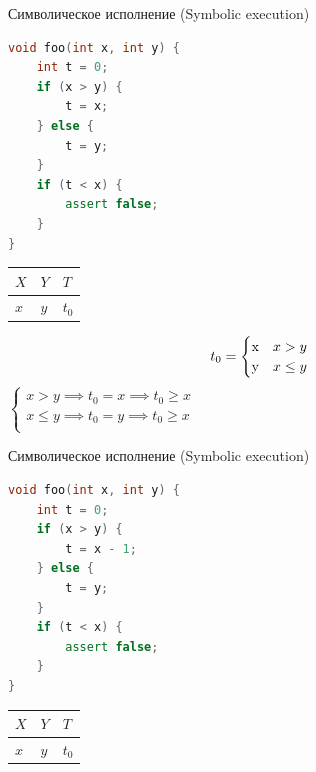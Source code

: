 \documentclass{beamer}
\begin{document}
\begin{frame}[fragile]{Символическое исполнение (Symbolic execution)}
\begin{minipage}{0.49\textwidth}
\begin{lstlisting}[language=C++]
void foo(int x, int y) {
    int t = 0;
    if (x > y) {
        t = x;
    } else {
        t = y;
    }
    if (t < x) {
        assert false;
    }
}
\end{lstlisting}
\end{minipage}
\hfill
\begin{minipage}{0.49\textwidth}
\begin{center}
\begin{tabular}{ | l | l | l | }
\hline
$X$ & $Y$ & $T$ \\
\hline
$x$ & $y$ & $t_0$ \\
\hline
\end{tabular}
\begin{equation*}
t_0 =
    \begin{cases}
    $x$ &\text{$x > y$}\\
    $y$ &\text{$x \le y$}
    \end{cases}
\end{equation*}
$\left\{
\begin{array}{l}
x > y \implies t_0 = x \implies t_0 \ge x \\
x \le y \implies t_0 = y \implies t_0 \ge x \\
\end{array}
\right.$
\end{center}
\end{minipage}
\end{frame}

\begin{frame}[fragile]{Символическое исполнение (Symbolic execution)}
\begin{minipage}{0.49\textwidth}
\begin{lstlisting}[language=C++]
void foo(int x, int y) {
    int t = 0;
    if (x > y) {
        t = x - 1;
    } else {
        t = y;
    }
    if (t < x) {
        assert false;
    }
}
\end{lstlisting}
\end{minipage}
\hfill
\begin{minipage}{0.49\textwidth}
\begin{center}
\begin{tabular}{ | l | l | l | }
\hline
$X$ & $Y$ & $T$ \\
\hline
$x$ & $y$ & $t_0$ \\
\hline
\end{tabular}
\end{center}
\end{minipage}
\end{frame}
\end{document}

